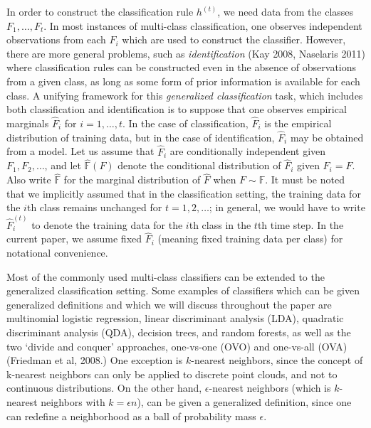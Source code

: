 \documentclass{article}
\begin{document}
In order to construct the classification rule $h^{(t)}$, we need data from the classes $F_1,\hdots, F_t$.
In most instances of multi-class classification, one observes independent observations from each $F_i$
which are used to construct the classifier.
However, there are more general problems, such as \emph{identification} (Kay 2008, Naselaris 2011)
where classification rules can be constructed even in the absence of observations from a given class,
as long as some form of prior information is available for each class.
A unifying framework for this \emph{generalized classification} task, 
which includes both classification and identification is to suppose that one observes empirical marginals
$\hat{F}_i$ for $i = 1,\hdots, t$.
In the case of classification, $\hat{F}_i$ is the empirical distribution of training data, but in the case of
identification, $\hat{F}_i$ may be obtained from a model.
Let us assume that $\hat{F}_i$ are conditionally independent given $F_1,F_2,\hdots$, and let
$\hat{\mathbb{F}}(F)$ denote the conditional distribution of $\hat{F}_i$ given  $F_i = F$.
Also write $\hat{\mathbb{F}}$ for the marginal distribution of $\hat{F}$ when $F \sim \mathbb{F}.$
It must be noted that we implicitly assumed that in the classification setting,
the training data for the $i$th class remains unchanged
for $t = 1,2,\hdots$; in general, we would have to write $\hat{F}_i^{(t)}$ to denote the training data
for the $i$th class in the $t$th time step.  In the current paper, we assume fixed $\hat{F}_i$ (meaning fixed training data per class) for notational convenience.

Most of the commonly used multi-class classifiers can be extended to the generalized classification setting.
Some examples of classifiers which can be given generalized definitions
and which we will discuss throughout the paper are multinomial logistic regression, linear discriminant
analysis (LDA), quadratic discriminant analysis (QDA), decision trees,
and random forests, as well as the two `divide and conquer'
approaches, one-vs-one (OVO) and one-vs-all (OVA) (Friedman et al,
2008.)  One exception is $k$-nearest neighbors, since the concept of k-nearest neighbors
can only be applied to discrete point clouds, and not to continuous distributions.
On the other hand, $\epsilon$-nearest neighbors (which is $k$-nearest neighbors with $k = \epsilon n$),
can be given a generalized definition, since one can redefine a neighborhood as a ball of probability mass $\epsilon$.
\end{document}
